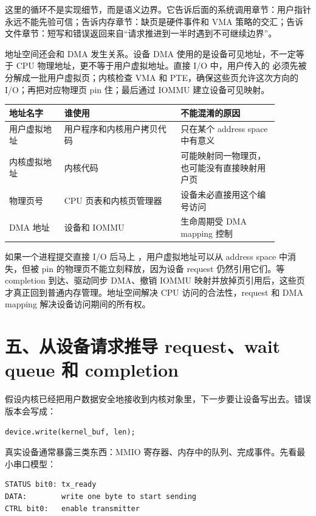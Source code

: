 这里的循环不是实现细节，而是语义边界。它告诉后面的系统调用章节：用户指针永远不能先验可信；告诉内存章节：缺页是硬件事件和 VMA 策略的交汇；告诉文件章节：短写和错误返回来自“请求推进到一半时遇到不可继续边界”。

地址空间还会和 DMA 发生关系。设备 DMA 使用的是设备可见地址，不一定等于 CPU 物理地址，更不等于用户虚拟地址。直接 I/O 中，用户传入的  必须先被分解成一批用户虚拟页；内核检查 VMA 和 PTE，确保这些页允许这次方向的 I/O；再把对应物理页 pin 住；最后通过 IOMMU 建立设备可见映射。

\begin{longtable}{p{0.18\linewidth}p{0.38\linewidth}p{0.32\linewidth}}
\toprule
地址名字 & 谁使用 & 不能混淆的原因 \\
\midrule
用户虚拟地址 & 用户程序和内核用户拷贝代码 & 只在某个 address space 中有意义 \\
内核虚拟地址 & 内核代码 & 可能映射同一物理页，也可能没有直接映射用户页 \\
物理页号 & CPU 页表和内核页管理器 & 设备未必直接用这个编号访问 \\
DMA 地址 & 设备和 IOMMU & 生命周期受 DMA mapping 控制 \\
\bottomrule
\end{longtable}

如果一个进程提交直接 I/O 后马上 ，用户虚拟地址可以从 address space 中消失，但被 pin 的物理页不能立刻释放，因为设备 request 仍然引用它们。等 completion 到达、驱动同步 DMA、撤销 IOMMU 映射并放掉页引用后，这些页才真正回到普通内存管理。地址空间解决 CPU 访问的合法性，request 和 DMA mapping 解决设备访问期间的所有权。

\section{五、从设备请求推导 request、wait queue 和 completion}

假设内核已经把用户数据安全地接收到内核对象里，下一步要让设备写出去。错误版本会写成：

\begin{lstlisting}
device.write(kernel_buf, len);
\end{lstlisting}

真实设备通常暴露三类东西：MMIO 寄存器、内存中的队列、完成事件。先看最小串口模型：

\begin{lstlisting}
STATUS bit0: tx_ready
DATA:        write one byte to start sending
CTRL bit0:   enable transmitter
\end{lstlisting}

